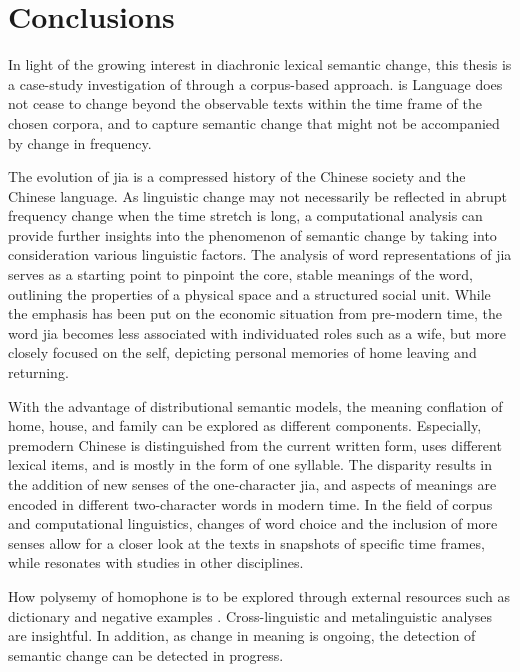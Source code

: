 

\chapter{Conclusions}
\label{conclusions}

In light of the growing interest in diachronic lexical semantic change, this thesis is a case-study investigation of \jia through a corpus-based approach. is Language does not cease to change beyond the observable texts within the time frame of the chosen corpora, and to capture semantic change that might not be accompanied by change in frequency.

The evolution of jia is a compressed history of the Chinese society and the Chinese language. As linguistic change may not necessarily be reflected in abrupt frequency change when the time stretch is long, a computational analysis can provide further insights into the phenomenon of semantic change by taking into consideration various linguistic factors. The analysis of word representations of jia serves as a starting point to pinpoint the core, stable meanings of the word, outlining the properties of a physical space and a structured social unit. While the emphasis has been put on the economic situation from pre-modern time, the word jia becomes less associated with individuated roles such as a wife, but more closely focused on the self, depicting personal memories of home leaving and returning. 

With the advantage of distributional semantic models, the meaning conflation of home, house, and family can be explored as different components. Especially, premodern Chinese is distinguished from the current written form, uses different lexical items, and is mostly in the form of one syllable. The disparity results in the addition of new senses of the one-character jia, and aspects of meanings are encoded in different two-character words in modern time. In the field of corpus and computational linguistics, changes of word choice and the inclusion of more senses allow for a closer look at the texts in snapshots of specific time frames, while resonates with studies in other disciplines.

How polysemy of homophone is to be explored through external resources such as dictionary and negative examples \textcite[15]{traugott2001regularity}.  Cross-linguistic and metalinguistic analyses are insightful. In addition, as change in meaning is ongoing, the detection of semantic change can be detected in progress.

